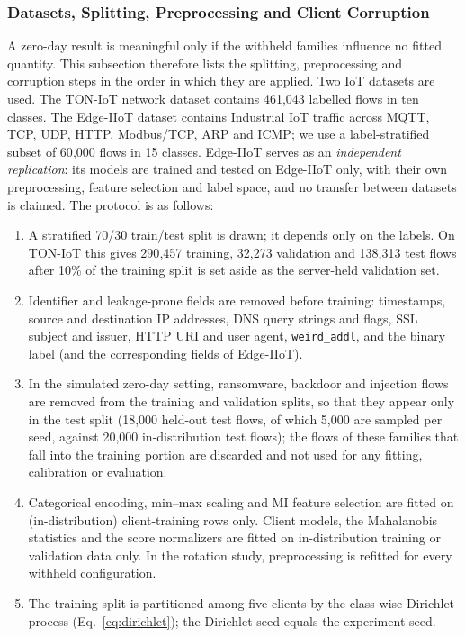 \documentclass[pdflatex,sn-mathphys-num]{sn-jnl}
\begin{document}
{{\subsubsection{Datasets, Splitting, Preprocessing and Client Corruption}\label{sec:protocol_data}
A zero-day result is meaningful only if the withheld families influence no fitted quantity. This subsection therefore lists the splitting, preprocessing and corruption steps in the order in which they are applied. Two IoT datasets are used. The TON-IoT network dataset \cite{moustafa2020toniot} contains 461{,}043 labelled flows in ten classes. The Edge-IIoT dataset \cite{ferrag2022edgeiiotset} contains Industrial IoT traffic across MQTT, TCP, UDP, HTTP, Modbus/TCP, ARP and ICMP; we use a label-stratified subset of 60{,}000 flows in 15 classes. Edge-IIoT serves as an \emph{independent replication}: its models are trained and tested on Edge-IIoT only, with their own preprocessing, feature selection and label space, and no transfer between datasets is claimed. The protocol is as follows:
\begin{enumerate}
\item A stratified 70/30 train/test split is drawn; it depends only on the labels. On TON-IoT this gives 290{,}457 training, 32{,}273 validation and 138{,}313 test flows after 10\% of the training split is set aside as the server-held validation set.
\item Identifier and leakage-prone fields are removed before training: timestamps, source and destination IP addresses, DNS query strings and flags, SSL subject and issuer, HTTP URI and user agent, \texttt{weird\_addl}, and the binary label (and the corresponding fields of Edge-IIoT).
\item In the simulated zero-day setting, ransomware, backdoor and injection flows are removed from the training and validation splits, so that they appear only in the test split (18{,}000 held-out test flows, of which 5{,}000 are sampled per seed, against 20{,}000 in-distribution test flows); the flows of these families that fall into the training portion are discarded and not used for any fitting, calibration or evaluation.
\item Categorical encoding, min--max scaling and MI feature selection are fitted on (in-distribution) client-training rows only. Client models, the Mahalanobis statistics and the score normalizers are fitted on in-distribution training or validation data only. In the rotation study, preprocessing is refitted for every withheld configuration.
\item The training split is partitioned among five clients by the class-wise Dirichlet process (Eq.~\ref{eq:dirichlet}); the Dirichlet seed equals the experiment seed.

\end{enumerate}}}
\end{document}
